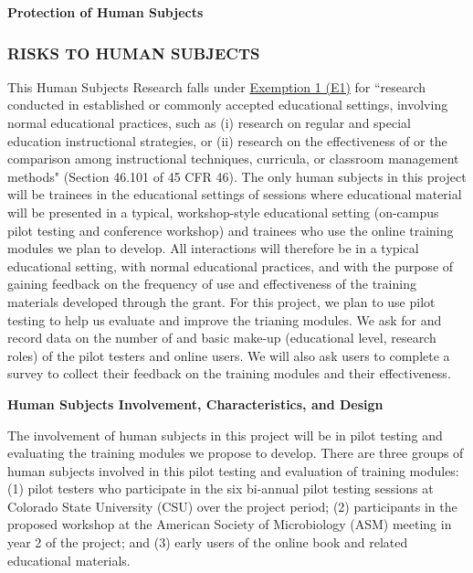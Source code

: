 \documentclass[pdftex,english,11.5pt,parskip=half]{scrartcl}
\begin{document}
\def\bf{\normalfont\bfseries}
\pagestyle{empty}

{\large \textbf{Protection of Human Subjects}}

\subsubsection*{RISKS TO HUMAN SUBJECTS}

This Human Subjects Research falls under \underline{Exemption 1 (E1)} for ``research conducted in established or commonly accepted educational settings, involving normal educational practices, such as (i) research on regular and special education instructional strategies, or (ii) research on the effectiveness of or the comparison among instructional techniques, curricula, or classroom management methods" (Section 46.101 of 45 CFR 46). The only human subjects in this project will be trainees in the educational settings of sessions where educational material will be presented in a typical, workshop-style educational setting (on-campus pilot testing and conference workshop) and trainees who use the online training modules we plan to develop. All interactions will therefore be in a typical educational setting, with normal educational practices, and with the purpose of gaining feedback on the frequency of use and effectiveness of the training materials developed through the grant. For this project, we plan to use pilot testing to help us evaluate and improve the trianing modules. We ask for and record data on the number of and basic make-up (educational level, research roles) of the pilot testers and online users. We will also ask users to complete a survey to collect their feedback on the training modules and their effectiveness. 

\textbf{Human Subjects Involvement, Characteristics, and Design}

The involvement of human subjects in this project will be in pilot testing and 
evaluating the training modules we propose to develop. There are three groups of
human subjects involved in this pilot testing and evaluation of training modules: 
(1) pilot testers who participate in the six bi-annual pilot testing sessions at 
Colorado State University (CSU) over the project period; (2) participants in the proposed
workshop at the American Society of Microbiology (ASM) meeting in year 2 of the project; 
and (3) early users of the online book and related educational materials. 
\end{document}

